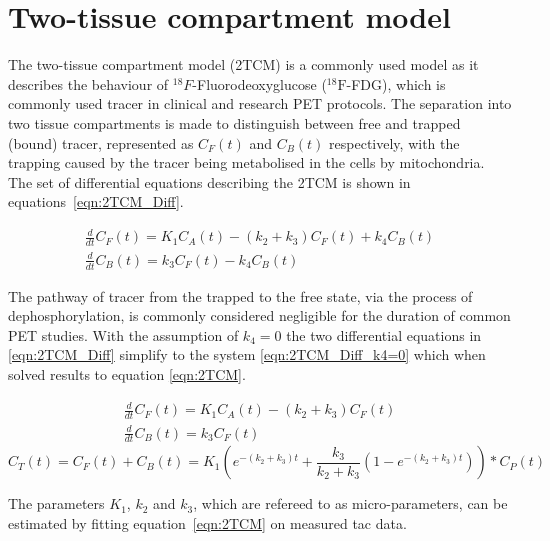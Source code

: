 \section{Two-tissue compartment model}
The two-tissue compartment model (2TCM) is a commonly used model as it describes the behaviour of ${}^{18}F$-Fluorodeoxyglucose (${}^{18}\mathrm{F}$-FDG), which is commonly used tracer in clinical and research PET protocols. The separation into two tissue compartments is made to distinguish between free and trapped (bound) tracer, represented as $C_F(t)$ and $C_B(t)$ respectively, with the trapping caused by the tracer being metabolised in the cells by mitochondria. The set of differential equations describing the 2TCM is shown in equations~\ref{eqn:2TCM_Diff}.

\begin{subequations}
\begin{align}
\frac{d}{dt}C_F(t) = K_1 C_A(t) - (k_2 + k_3)C_F(t) + k_4 C_B(t) \\ 
\frac{d}{dt}C_B(t) = k_3 C_F(t) - k_4 C_B(t)  
\end{align}
\label{eqn:2TCM_Diff}
\end{subequations}

The pathway of tracer from the trapped to the free state, via the process of dephosphorylation, is commonly considered negligible for the duration of common PET studies. With the assumption of $k_4=0$ the two differential equations in \ref{eqn:2TCM_Diff} simplify to the system \ref{eqn:2TCM_Diff_k4=0} which when solved results to equation \ref{eqn:2TCM}. 

\begin{subequations}
\begin{align}
\frac{d}{dt}C_F(t) = K_1 C_A(t) - (k_2 + k_3)C_F(t) \\ 
\frac{d}{dt}C_B(t) = k_3 C_F(t)  
\end{align}
\label{eqn:2TCM_Diff_k4=0}
\end{subequations}
%
\begin{equation}
C_T(t) =  C_F(t) + C_B(t) = K_1 ( e^{-(k_2+k_3)t} + \frac{k_3}{k_2+k_3}(1-e^{-(k_2+k_3)t})) \ast C_P(t)   
\label{eqn:2TCM}
\end{equation}

The parameters $K_1$, $k_2$ and $k_3$, which are refereed to as micro-parameters, can be estimated by fitting equation~\ref{eqn:2TCM} on measured \gls{tac} data. 

